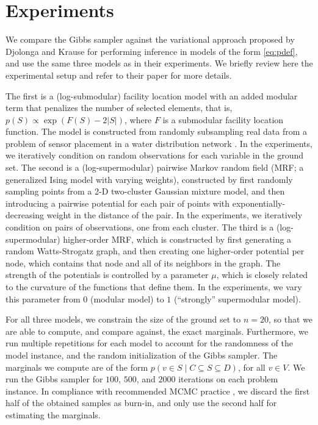 \section{Experiments}
We compare the Gibbs sampler against the variational approach proposed by Djolonga and Krause \cite{djolonga14} for performing inference in models of the form \eqref{eq:pdef}, and use the same three models as in their experiments.
We briefly review here the experimental setup and refer to their paper for more details.

The first is a (log-submodular) facility location model with an added modular term that penalizes the number of selected elements, that is, $p(S) \propto \exp(F(S)-2|S|)$, where $F$ is a submodular facility location function.
The model is constructed from randomly subsampling real data from a problem of sensor placement in a water distribution network \cite{krause08}.
In the experiments, we iteratively condition on random observations for each variable in the ground set.
The second is a (log-supermodular) pairwise Markov random field (MRF; a generalized Ising model with varying weights), constructed by first randomly sampling points from a 2-D two-cluster Gaussian mixture model, and then introducing a pairwise potential for each pair of points with exponentially-decreasing weight in the distance of the pair.
In the experiments, we iteratively condition on pairs of observations, one from each cluster.
The third is a (log-supermodular) higher-order MRF, which is constructed by first generating a random Watts-Strogatz graph, and then creating one higher-order potential per node, which contains that node and all of its neighbors in the graph.
The strength of the potentials is controlled by a parameter $\mu$, which is closely related to the curvature of the functions that define them.
In the experiments, we vary this parameter from $0$ (modular model) to $1$ (``strongly'' supermodular model).

For all three models, we constrain the size of the ground set to $n = 20$, so that we are able to compute, and compare against, the exact marginals.
Furthermore, we run multiple repetitions for each model to account for the randomness of the model instance, and the random initialization of the Gibbs sampler.
The marginals we compute are of the form $p(v \in S \mid C \subseteq S \subseteq D)$, for all $v \in V$.
We run the Gibbs sampler for $100$, $500$, and $2000$ iterations on each problem instance.
In compliance with recommended MCMC practice \cite{gelman11}, we discard the first half of the obtained samples as burn-in, and only use the second half for estimating the marginals.

